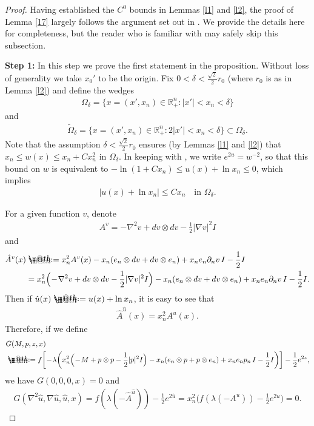 \documentclass[12pt]{article}
\makeatletter
\numberwithin{equation}{section}
\theoremstyle{plain}
\theoremstyle{definition}
\newcommand*{\defeq}{\mathrel{\rlap{%
			\raisebox{0.3ex}{$\m@th\cdot$}}%
		\raisebox{-0.3ex}{$\m@th\cdot$}}%
	=}
\makeatother
\begin{document}
\begin{proof}
	Having established the $C^0$ bounds in Lemmas \ref{l1} and \ref{l2}, the proof of Lemma \ref{17} largely follows the argument set out in \cite{LNX22}. We provide the details here for completeness, but the reader who is familiar with \cite{LNX22} may safely skip this subsection. \medskip 
	
	\noindent\textbf{Step 1:} In this step we prove the first statement in the proposition. Without loss of generality we take $x_0'$ to be the origin. Fix $0<\delta< \frac{\sqrt{2}}{2}r_0$ (where $r_0$ is as in Lemma \ref{l2}) and define the wedges
	\begin{align*}
	\Omega_{\delta} = \{x=(x',x_n)\in\mathbb{R}^n_+: |x'| < x_n < \delta\}
	\end{align*}
	and
	\begin{align*}
	\widetilde{\Omega}_{\delta} = \{x=(x',x_n)\in\mathbb{R}^n_+: 2|x'| < x_n < \delta\} \subset \Omega_\delta.
	\end{align*}
	Note that the assumption $\delta < \frac{\sqrt{2}}{2}r_0$ ensures (by Lemmas \ref{l1} and \ref{l2}) that $x_n \leq w(x) \leq x_n + Cx_n^2$ in $\Omega_{\delta}$. In keeping with \cite{LNX22}, we write $e^{2u} = w^{-2}$, so that this bound on $w$ is equivalent to $-\ln(1+Cx_n) \leq u(x) + \ln x_n \leq 0$, which implies 
	\begin{align}\label{21}
	|u(x) + \ln x_n| \leq Cx_n \quad \text{in }\Omega_\delta.
	\end{align}
	
	
	For a given function $v$, denote
	\begin{align*}
	A^v = -\nabla^2 v+ dv\otimes dv - \frac{1}{2}|\nabla v|^2 I
	\end{align*}
	and
	\begin{align*}
	\hat{A}^v(x) & \defeq x_n^2 A^v(x) -x_n(e_n\otimes dv + dv\otimes e_n) + x_n e_n \partial_n v\, I - \frac{1}{2}I \nonumber \\
	& = x_n^2\Big(\!-\!\nabla^2 v + dv\otimes dv - \frac{1}{2}|\nabla v|^2 I\Big)-x_n(e_n\otimes dv + dv\otimes e_n) + x_n e_n \partial_n v\, I - \frac{1}{2}I. 
	\end{align*}
	Then if $\hat{u}(x) \defeq u(x) + \ln x_n$, it is easy to see that
	\begin{align*}
	\hat{A}^{\hat{u}}(x) = x_n^2 A^u (x).
	\end{align*}
	Therefore, if we define
	\begin{align*}
	&G(M,p,z,x) \nonumber \\
	 &\defeq f\bigg[\!-\!\lambda\bigg(x_n^2\Big(\!-\!M + p\otimes p - \frac{1}{2}|p|^2 I\Big)-x_n(e_n\otimes p + p\otimes e_n)   + x_n e_n p_n\, I - \frac{1}{2}I\bigg)\bigg] - \frac{1}{2}e^{2z},
	\end{align*}
	we have $G(0,0,0,x) = 0$ and 
	\begin{align*}
	G(\nabla^2 \hat{u}, \nabla \hat{u}, \hat{u},x) = f(\lambda(-\hat{A}^{\hat{u}})) - \frac{1}{2}e^{2\hat{u}} = x_n^2\bigg(f(\lambda(-A^u)) - \frac{1}{2}e^{2u}\bigg) = 0. 
	\end{align*}
	

\end{proof}
\end{document}
